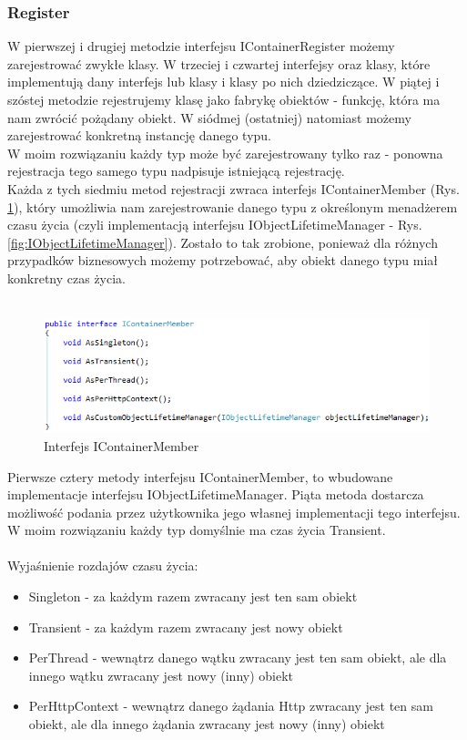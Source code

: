 \documentclass[12pt]{article}
\begin{document}
\subsubsection{Register}
W pierwszej i drugiej metodzie interfejsu IContainerRegister możemy zarejestrować zwykłe klasy. W trzeciej i czwartej interfejsy oraz klasy, które implementują dany interfejs lub klasy i klasy po nich dziedziczące. W piątej i szóstej metodzie rejestrujemy klasę jako fabrykę obiektów - funkcję, która ma nam zwrócić pożądany obiekt. W siódmej (ostatniej) natomiast możemy zarejestrować konkretną instancję danego typu.\\
W moim rozwiązaniu każdy typ może być zarejestrowany tylko raz - ponowna rejestracja tego samego typu nadpisuje istniejącą rejestrację.\\
Każda z tych siedmiu metod rejestracji zwraca interfejs IContainerMember (Rys. \ref{fig:IContainerMember}), który umożliwia nam zarejestrowanie danego typu z określonym menadżerem czasu życia (czyli implementacją interfejsu IObjectLifetimeManager - Rys. \ref{fig:IObjectLifetimeManager}). Zostało to tak zrobione, ponieważ dla różnych przypadków biznesowych możemy potrzebować, aby obiekt danego typu miał konkretny czas życia.\\ \\
\begin{figure}[H]
	\begin{center}
  		\includegraphics{IContainerMember.png}
  		\caption{Interfejs IContainerMember}
  		\label{fig:IContainerMember}
	\end{center}
\end{figure}
Pierwsze cztery metody interfejsu IContainerMember, to wbudowane implementacje interfejsu IObjectLifetimeManager. Piąta metoda dostarcza możliwość podania przez użytkownika jego własnej implementacji tego interfejsu. W moim rozwiązaniu każdy typ domyślnie ma czas życia Transient.\\
\\
Wyjaśnienie rozdajów czasu życia:
\begin{itemize}
	\item Singleton - za każdym razem zwracany jest ten sam obiekt
	\item Transient - za każdym razem zwracany jest nowy obiekt
	\item PerThread - wewnątrz danego wątku zwracany jest ten sam obiekt, ale dla innego wątku zwracany jest nowy (inny) obiekt
	\item PerHttpContext - wewnątrz danego żądania Http zwracany jest ten sam obiekt, ale dla innego żądania zwracany jest nowy (inny) obiekt
\end{itemize}
\end{document}
